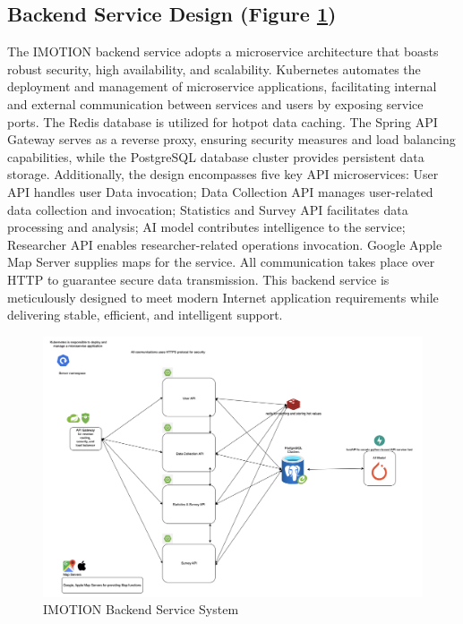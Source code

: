 \documentclass[12pt,two side]{report}
\begin{document}
\subsection{Backend Service Design (Figure \ref{figure:5})}
The IMOTION backend service adopts a microservice architecture that boasts robust security, high availability, and scalability. Kubernetes automates the deployment and management of microservice applications, facilitating internal and external communication between services and users by exposing service ports. The Redis database is utilized for hotpot data caching. The Spring API Gateway serves as a reverse proxy, ensuring security measures and load balancing capabilities, while the PostgreSQL database cluster provides persistent data storage. Additionally, the design encompasses five key API microservices: User API handles user Data invocation; Data Collection API manages user-related data collection and invocation; Statistics and Survey API facilitates data processing and analysis; AI model contributes intelligence to the service; Researcher API enables researcher-related operations invocation. Google Apple Map Server supplies maps for the service. All communication takes place over HTTP to guarantee secure data transmission. This backend service is meticulously designed to meet modern Internet application requirements while delivering stable, efficient, and intelligent support.
\begin{figure}
\centering
\includegraphics[width=16cm]{background_report/figures/backend-service-system.png}
\caption{IMOTION Backend Service System}
\label{figure:5}
\end{figure}
\end{document}
